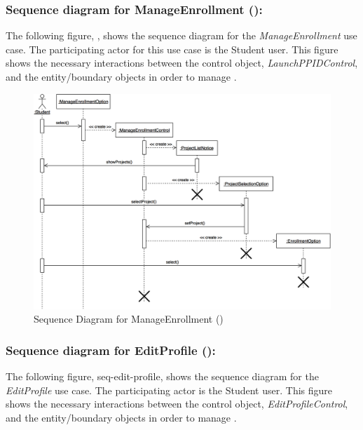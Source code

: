 \documentclass[12pt,letterpaper]{article}
\begin{document}
\newpage{}

\subsubsection*{Sequence diagram for ManageEnrollment ():}

The following figure, , shows the sequence diagram for the {\it ManageEnrollment} use case. The participating actor for this use case
is the Student user. This figure shows the necessary interactions between the control object, {\it LaunchPPIDControl}, and the entity/boundary objects
in order to manage .
\begin{figure}[H]
	\centering{}
	\includegraphics[scale=0.27]{imgs/seq/manage-enrollment.png}
	\caption[ - Sequence Diagram for ManageEnrollment]{Sequence Diagram for ManageEnrollment ()}
\end{figure}

\newpage{}

\subsubsection*{Sequence diagram for EditProfile ():}

The following figure, {seq-edit-profile}, shows the sequence diagram for the {\it EditProfile} use case. The participating actor is the 
Student user. This figure shows the necessary interactions between the control object, {\it EditProfileControl}, and the entity/boundary objects
in order to manage .
\end{document}
